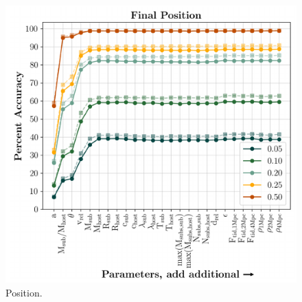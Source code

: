 \documentclass[fleqn,usenatbib]{mnras}
\begin{document}
\begin{figure}
	\includegraphics[width=\columnwidth]{Figures/position_predictions}
    \caption{Position.}
    \label{fig:position_predictions}
\end{figure}
\end{document}
